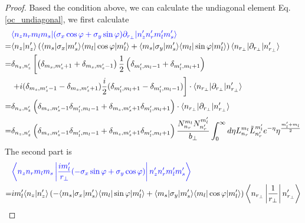 \begin{proof}
Based the condition above, we can calculate the undiagonal element Eq.\eqref{oc_undiagonal}, we first calculate
\begin{equation}
  \begin{aligned}
    &\textcolor{blue}{\langle n_z n_r m_l m_s | (\sigma_x \cos\varphi + \sigma_{y}\sin\varphi)\partial_{r_{\perp}}| n_z^{\prime} n_r^{\prime} m_l^{\prime} m_s^{\prime} \rangle}\\
    =& \langle n_z | n_z^{\prime} \rangle \left(\langle m_s | \sigma_x | m_s^{\prime} \rangle \langle m_l | \cos\varphi | m_l^{\prime} \rangle + \langle m_s | \sigma_y | m_s^{\prime} \rangle \langle m_l | \sin\varphi | m_l^{\prime}\rangle\right) \langle n_{r_{\perp}} | \partial_{r_{\perp}} | n_{r_\perp}^{\prime} \rangle \\
    =& \delta_{n_z,n_z^{\prime}} \left[\left( \delta_{m_s,m_s^{\prime}+1} + \delta_{m_s,m_s^{\prime}-1} \right) \frac{1}{2}\left(\delta_{m_{l}^{\prime},m_{l}-1}+\delta_{m_{l}^{\prime},m_{l}+1}\right) \right. \\
    & \left. + i(\delta_{m_s,m_s^{\prime}-1} - \delta_{m_s,m_s^{\prime}+1}) \frac{i}{2} (\delta _{m_{l}^{\prime},m_{l}+1} - \delta_{m_{l}^{\prime},m_{l}-1}) \right] \cdot \langle n_{r_{\perp}} | \partial_{r_{\perp}} | n_{r_\perp}^{\prime} \rangle \\
    =& \delta_{n_z,n_z^{\prime}} \left( \delta_{m_s,m_s^{\prime}-1} \delta_{m_{l}^{\prime},m_{l}-1} + \delta_{m_s,m_s^{\prime}+1} \delta _{m_{l}^{\prime},m_{l}+1} \right) \cdot \langle n_{r_{\perp}} | \partial_{r_{\perp}} | n_{r_\perp}^{\prime} \rangle\\
    =& \delta_{n_z,n_z^{\prime}} \left( \delta_{m_s,m_s^{\prime}-1} \delta_{m_{l}^{\prime},m_{l}-1} + \delta_{m_s,m_s^{\prime}+1} \delta _{m_{l}^{\prime},m_{l}+1} \right) \frac{N_{n_r}^{m_l} N_{n_r^{\prime}}^{m_l^{\prime}}}{b_{\perp}} \int_{0}^{\infty} d\eta L_{n_r}^{m_l}\tilde{L}_{n_r^\prime}^{m_l^\prime} e^{-\eta} \eta^{\frac{m_{l}^{\prime} + m_l}{2}} \\
  \end{aligned}
\end{equation}
The second part is 
\begin{equation}
  \begin{aligned}
    &\textcolor{blue}{\left\langle n_z n_r m_l m_s \left| \frac{i m_l^\prime}{r_{\perp}}( -\sigma_x \sin\varphi + \sigma_{y}\cos\varphi) \right| n_z^{\prime} n_r^{\prime} m_l^{\prime} m_s^{\prime} \right\rangle}\\
    =& i m_l^\prime \langle n_z | n_z^{\prime} \rangle \left( -\langle m_s | \sigma_x | m_s^{\prime} \rangle \langle m_l | \sin\varphi | m_l^{\prime} \rangle + \langle m_s | \sigma_y | m_s^{\prime} \rangle \langle m_l | \cos\varphi | m_l^{\prime}\rangle\right) \left\langle n_{r_{\perp}} \left| \frac{1}{r_{\perp}} \right| n_{r_\perp}^{\prime} \right\rangle \\

\end{aligned}
\end{equation}
\end{proof}
